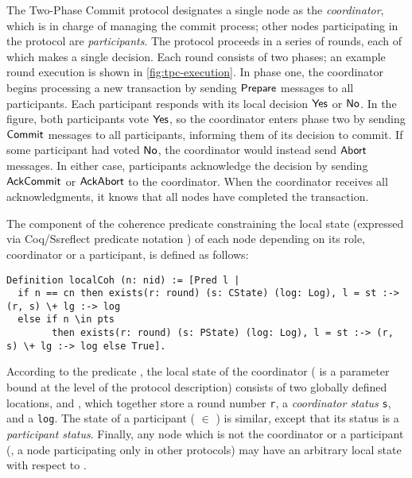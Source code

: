 The Two-Phase Commit protocol designates a single node as the
\emph{coordinator}, which is in charge of managing the commit process;
other nodes participating in the protocol are \emph{participants}.
%
The protocol proceeds in a series of rounds, each of which makes a
single decision.
%
Each round consists of two phases; an example round execution is
shown in \cref{fig:tpc-execution}.
%
In phase one, the coordinator begins processing a new transaction by sending
$\mathsf{Prepare}$ messages to all participants.
%
Each participant responds with its local decision $\mathsf{Yes}$ or $\mathsf{No}$.
%
In the figure, both participants vote $\mathsf{Yes}$, so the coordinator
enters phase two by sending $\mathsf{Commit}$ messages to all participants,
informing them of its decision to commit.
%
If some participant had voted $\mathsf{No}$, the coordinator would instead
send $\mathsf{Abort}$ messages.
%
In either case, participants acknowledge the decision by sending
$\mathsf{AckCommit}$ or $\mathsf{AckAbort}$ to the coordinator.
%
When the coordinator receives all acknowledgments, it knows that all
nodes have completed the transaction.

The component of the coherence predicate constraining the local state
 (expressed via Coq/Ssreflect predicate notation \code{[Pred l
  | ...]}) of each node  depending on its role, coordinator or
a participant, is defined as follows:


\begin{lstlisting}[style=Coq, basicstyle=\footnotesize\ttfamily]
Definition localCoh (n: nid) := [Pred l |
  if n == cn then exists(r: round) (s: CState) (log: Log), l = st :-> (r, s) \+ lg :-> log
  else if n \in pts
        then exists(r: round) (s: PState) (log: Log), l = st :-> (r, s) \+ lg :-> log else True].
\end{lstlisting}
%
%
According to the predicate , the local state of the
coordinator ( is a parameter bound at the level of the
protocol description) consists of two globally defined locations,
 and , which together store a round number
\texttt{r}, a \emph{coordinator status} \texttt{s}, and a
\texttt{log}.
%
The state of a participant ( $\in$ ) is similar, except
that its status is a \emph{participant status}.
%
Finally, any node which is not the coordinator or a participant (\eg,
a node participating only in other protocols) may have an arbitrary
local state with respect to .


